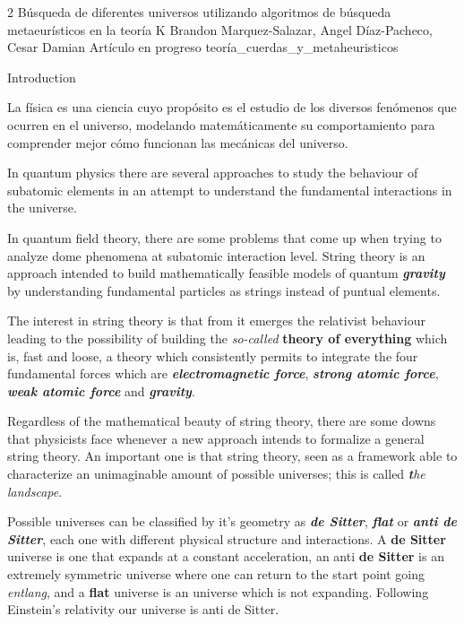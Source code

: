 \documentclass[]{papertexKS}
\begin{document}
\begin{news}{2}
    {Búsqueda de diferentes universos utilizando algoritmos de búsqueda metaeurísticos en la teoría K}
    {Brandon Marquez-Salazar, Angel Díaz-Pacheco, Cesar Damian}
    {Artículo en progreso}
    {teoría_cuerdas_y_metaheuristicos}

\nocite{*}

\noindent\textcolor{color}{\Large{Introduction}} \label{sec:intro}

La física es una ciencia cuyo propósito es el estudio de los diversos
fenómenos que ocurren en el universo, modelando matemáticamente su
comportamiento para comprender mejor cómo funcionan las mecánicas del
universo.

In quantum physics there are several approaches to study the behaviour of subatomic elements in an attempt to understand the fundamental interactions in the universe.

In quantum field theory, there are some problems that come up when trying to analyze dome phenomena at subatomic interaction level.
String theory is an approach intended to build mathematically feasible models of quantum \textit{\bfseries gravity}\cite{StringTheoryAndMTheory} by understanding fundamental particles as strings instead of puntual elements.

The interest in string theory is that from it emerges the relativist behaviour leading to the possibility of building the \textit{so-called} \textbf{theory of everything} which is, fast and loose, a theory which consistently permits to integrate the four fundamental forces which are \textit{\textbf{electromagnetic force}}, \textit{\textbf{strong atomic force}}, \textit{\textbf{weak atomic force}} and \textit{\textbf{gravity}}.

Regardless of the mathematical beauty of string theory, there are some downs that physicists face whenever a new approach intends to formalize a general string theory. An important one is that string theory, seen as a framework able to characterize an unimaginable amount of possible universes; this is called \textit{\textbf the landscape}.

Possible universes can be classified by it's geometry as \textit{\textbf{de Sitter}}, \textit{\textbf{flat}} or \textit{\textbf{anti de Sitter}}, each one with different physical structure and interactions. A \textbf{de Sitter} universe is one that expands at a constant acceleration, an anti \textbf{de Sitter} is an extremely symmetric universe where one can return to the start point going \textit{entlang}, and a \textbf{flat} universe is an universe which is not expanding.
Following Einstein's relativity our universe is anti de Sitter.


\end{news}
\end{document}
